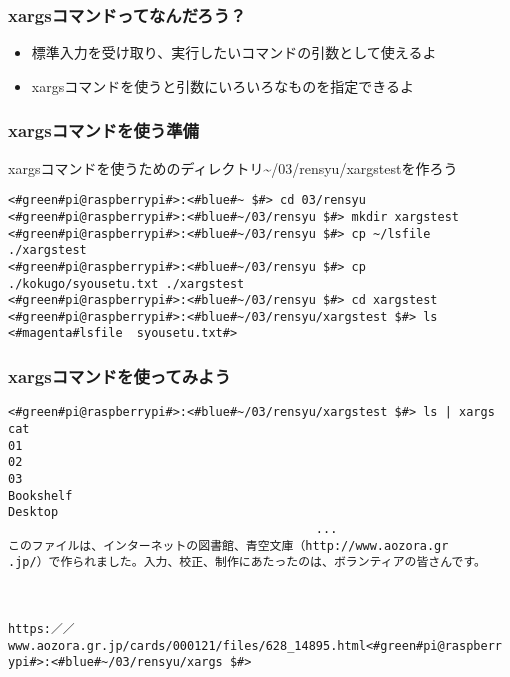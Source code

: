 \begin{frame}
    \frametitle{xargsコマンドってなんだろう？}
    \vspace{2em}
    \begin{itemize}
        \item 標準入力を受け取り、実行したいコマンドの引数として使えるよ
        \item xargsコマンドを使うと引数にいろいろなものを指定できるよ
    \end{itemize}
    \begin{figure}
        \centering
        
    \end{figure}
\end{frame}

\begin{frame}[fragile]
    \frametitle{xargsコマンドを使う準備}
    xargsコマンドを使うためのディレクトリ\textasciitilde/03/rensyu/xargstestを作ろう
    \begin{lstlisting}
<#green#pi@raspberrypi#>:<#blue#~ $#> cd 03/rensyu
<#green#pi@raspberrypi#>:<#blue#~/03/rensyu $#> mkdir xargstest
<#green#pi@raspberrypi#>:<#blue#~/03/rensyu $#> cp ~/lsfile ./xargstest
<#green#pi@raspberrypi#>:<#blue#~/03/rensyu $#> cp ./kokugo/syousetu.txt ./xargstest
<#green#pi@raspberrypi#>:<#blue#~/03/rensyu $#> cd xargstest
<#green#pi@raspberrypi#>:<#blue#~/03/rensyu/xargstest $#> ls
<#magenta#lsfile  syousetu.txt#>
    \end{lstlisting}
\end{frame}

\begin{frame}[fragile]
    \frametitle{xargsコマンドを使ってみよう}
    \begin{lstlisting}[title=xargsコマンドを使ってcatコマンドを使う]
<#green#pi@raspberrypi#>:<#blue#~/03/rensyu/xargstest $#> ls | xargs cat
01
02
03
Bookshelf
Desktop
                                           ...
このファイルは、インターネットの図書館、青空文庫（http://www.aozora.gr
.jp/）で作られました。入力、校正、制作にあたったのは、ボランティアの皆さんです。


                
https:／／www.aozora.gr.jp/cards/000121/files/628_14895.html<#green#pi@raspberr
ypi#>:<#blue#~/03/rensyu/xargs $#>
    \end{lstlisting}
\end{frame}

